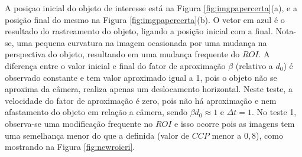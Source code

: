 A posiçao inicial do objeto de interesse está na Figura \ref{fig:imgpapercerta}(a), 
e a  posição final do mesmo na Figura \ref{fig:imgpapercerta}(b). 
O vetor em azul é o resultado do rastreamento do objeto, ligando a posição inicial com a final.
Nota-se, uma pequena curvatura na imagem ocasionada por uma mudança
na perspectiva do objeto, resultando em uma mudança frequente do $ROI$.
A diferença entre o valor inicial e final do fator de aproximação $\beta$ (relativo a $d_0$) é observado constante
e tem valor aproximado  igual a 1, pois o objeto não se aproxima da câmera, realiza apenas um deslocamento horizontal.
Neste teste, a velocidade do fator de aproximação é zero, pois não há aproximação e nem
afastamento do objeto em relação a câmera, sendo $\beta d_0 \approx 1$ e $\Delta t=1$.
No teste 1, observa-se uma modificação frequente no $ROI$ e isso ocorre pois as imagens 
tem uma semelhança menor do que a definida (valor de $CCP$ menor a $0,8$), como mostrando na Figura \ref{fig:newroicri}.
